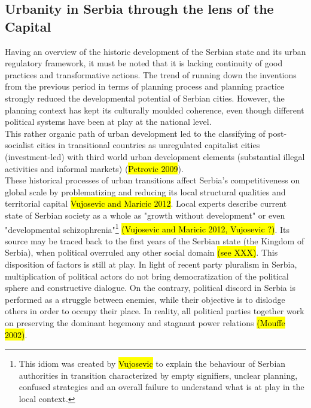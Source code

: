 \documentclass[11pt]{report}
\begin{document}
\subsection{Urbanity in Serbia through the lens of the Capital}

Having an overview of the historic development of the Serbian state and its urban regulatory framework, it must be noted that it is lacking continuity of good practices and transformative actions. The trend of running down the inventions from the previous period in terms of planning process and planning practice strongly reduced the developmental potential of Serbian cities\cite{ref Peric 2016}. However, the planning context has kept its culturally moulded coherence, even though different political systems have been at play at the national level.
\\    
This rather organic path of urban development led to the classifying of post-socialist cities in transitional countries as unregulated capitalist cities (investment-led) with third world urban development elements (substantial illegal activities and informal markets) (\hl{Petrovic 2009}).
\\ 
These historical processes of urban transitions affect Serbia's competitiveness on global scale by problematizing and reducing its local structural qualities and territorial capital \hl{Vujosevic and Maricic 2012}. Local experts describe current state of Serbian society as a whole as "growth without development" or even "developmental schizophrenia"\footnote{This idiom was created by \hl{Vujosevic} to explain the behaviour of Serbian authorities in transition characterized by empty signifiers, unclear planning, confused strategies and an overall failure to understand what is at play in the local context.} \hl{(Vujosevic and Maricic 2012, Vujosevic ?)}.
Its source may be traced back to the first years of the Serbian state (the Kingdom of Serbia), when political overruled any other social domain \hl{(see XXX)}. This disposition of factors is still at play. In light of recent party pluralism in Serbia, multiplication of political actors do not bring democratization of the political sphere and constructive dialogue. On the contrary, political discord in Serbia is performed as a struggle between enemies, while their objective is to dislodge others in order to occupy their place. In reality, all political parties together work on preserving the dominant hegemony and stagnant power relations \hl{(Mouffe 2002)}.
\\
\end{document}
